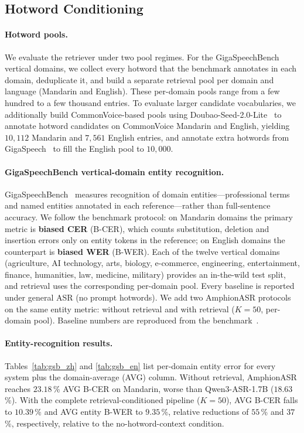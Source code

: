 \subsection{Hotword Conditioning}
\label{sec:hotwords}

\paragraph{Hotword pools.}
We evaluate the retriever under two pool regimes. For the
GigaSpeechBench vertical domains, we collect every hotword that the
benchmark annotates in each domain, deduplicate it, and build a
separate retrieval pool per domain and language (Mandarin and English).
These per-domain pools range from a few hundred to a few thousand
entries. To evaluate larger candidate vocabularies, we additionally
build CommonVoice-based pools using
Doubao-Seed-2.0-Lite~\cite{doubao2025seed} to annotate hotword
candidates on CommonVoice Mandarin and English, yielding $10{,}112$
Mandarin and $7{,}561$ English entries, and annotate extra hotwords
from GigaSpeech~\cite{chen2021gigaspeech} to fill the English pool to
$10{,}000$.

\paragraph{GigaSpeechBench vertical-domain entity recognition.}
GigaSpeechBench~\cite{tu2026gigaspeechbench} measures recognition of
domain entities---professional terms and named entities annotated in
each reference---rather than full-sentence accuracy. We follow the
benchmark protocol: on Mandarin domains the primary metric is
\textbf{biased CER} (B-CER), which counts substitution, deletion and
insertion errors only on entity tokens in the reference; on English
domains the counterpart is \textbf{biased WER} (B-WER). Each of the
twelve vertical domains (agriculture, AI technology, arts, biology,
e-commerce, engineering, entertainment, finance, humanities, law,
medicine, military) provides an in-the-wild test split, and retrieval
uses the corresponding per-domain pool. Every baseline is
reported under general ASR (no prompt hotwords). We add two AmphionASR
protocols on the same entity metric: without retrieval and with
retrieval ($K{=}50$, per-domain pool). Baseline numbers are reproduced
from the benchmark~\cite{tu2026gigaspeechbench}.





\paragraph{Entity-recognition results.}
Tables~\ref{tab:gsb_zh} and \ref{tab:gsb_en} list per-domain entity
error for every system plus the domain-average (AVG) column.
Without retrieval, AmphionASR reaches $23.18$\,\% AVG B-CER on
Mandarin, worse than Qwen3-ASR-1.7B ($18.63$\,\%).
With the complete retrieval-conditioned pipeline ($K{=}50$), AVG
B-CER falls to $10.39$\,\% and AVG entity B-WER to $9.35$\,\%,
relative reductions of $55$\,\% and $37$\,\%, respectively, relative
to the no-hotword-context condition.

